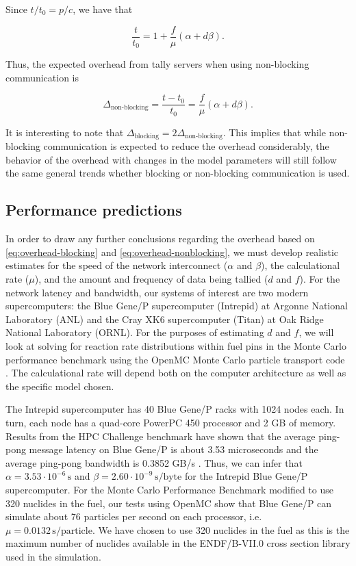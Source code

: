 \documentclass[3p]{elsarticle}
\newcommand{\unit}[1]{\ensuremath{\, \mathrm{#1}}}
\begin{document}
\noindent Since $t/t_0 = p/c$, we have that

\begin{equation}
  \label{eq:model-nonblocking}
  \frac{t}{t_0} = 1 + \frac{f}{\mu} \left ( \alpha + d\beta
    \right ).
\end{equation}

\noindent Thus, the expected overhead from tally servers when using non-blocking
communication is

\begin{equation}
  \label{eq:overhead-nonblocking}
  \Delta_{\text{non-blocking}} = \frac{t - t_0}{t_0} = \frac{f}{\mu} \left (
  \alpha + d\beta \right ).
\end{equation}

\noindent It is interesting to note that $\Delta_{\text{blocking}} =
2\Delta_{\text{non-blocking}}$. This implies that while non-blocking
communication is expected to reduce the overhead considerably, the behavior of
the overhead with changes in the model parameters will still follow the same
general trends whether blocking or non-blocking communication is used.

\subsection{Performance predictions}

In order to draw any further conclusions regarding the overhead based on
\eqref{eq:overhead-blocking} and \eqref{eq:overhead-nonblocking}, we must
develop realistic estimates for the speed of the network interconnect ($\alpha$
and $\beta$), the calculational rate ($\mu$), and the amount and frequency of
data being tallied ($d$ and $f$). For the network latency and bandwidth, our
systems of interest are two modern supercomputers: the Blue Gene/P supercomputer
(Intrepid) at Argonne National Laboratory (ANL) and the Cray XK6 supercomputer
(Titan) at Oak Ridge National Laboratory (ORNL). For the purposes of estimating
$d$ and $f$, we will look at solving for reaction rate distributions within fuel
pins in the Monte Carlo performance benchmark \cite{mc11-hoogenboom} using the
OpenMC Monte Carlo particle transport code \cite{ane-romano-2012}. The
calculational rate will depend both on the computer architecture as well as the
specific model chosen.

The Intrepid supercomputer has 40 Blue Gene/P racks with 1024 nodes each. In
turn, each node has a quad-core PowerPC 450 processor and 2 GB of
memory. Results from the HPC Challenge benchmark have shown that the average
ping-pong message latency on Blue Gene/P is about 3.53 microseconds and the
average ping-pong bandwidth is 0.3852 GB/s \cite{bluegene}. Thus, we can infer
that $\alpha = 3.53 \cdot 10^{-6} \unit{s}$ and $\beta = 2.60 \cdot 10^{-9}
\unit{s/byte}$ for the Intrepid Blue Gene/P supercomputer. For the Monte Carlo
Performance Benchmark modified to use 320 nuclides in the fuel, our tests using
OpenMC show that Blue Gene/P can simulate about 76 particles per second on each
processor, i.e. $\mu = 0.0132 \unit{s/particle}$. We have chosen to use 320
nuclides in the fuel as this is the maximum number of nuclides available in the
ENDF/B-VII.0 cross section library used in the simulation.
\end{document}
